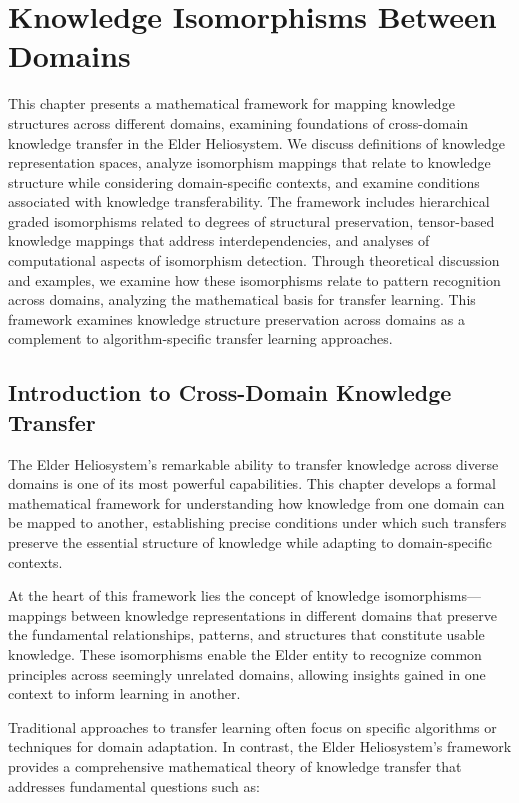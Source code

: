 \chapter{Knowledge Isomorphisms Between Domains}

\begin{chapterabstract}
This chapter presents a mathematical framework for mapping knowledge structures across different domains, examining foundations of cross-domain knowledge transfer in the Elder Heliosystem. We discuss definitions of knowledge representation spaces, analyze isomorphism mappings that relate to knowledge structure while considering domain-specific contexts, and examine conditions associated with knowledge transferability. The framework includes hierarchical graded isomorphisms related to degrees of structural preservation, tensor-based knowledge mappings that address interdependencies, and analyses of computational aspects of isomorphism detection. Through theoretical discussion and examples, we examine how these isomorphisms relate to pattern recognition across domains, analyzing the mathematical basis for transfer learning. This framework examines knowledge structure preservation across domains as a complement to algorithm-specific transfer learning approaches.
\end{chapterabstract}

\section{Introduction to Cross-Domain Knowledge Transfer}

The Elder Heliosystem's remarkable ability to transfer knowledge across diverse domains is one of its most powerful capabilities. This chapter develops a formal mathematical framework for understanding how knowledge from one domain can be mapped to another, establishing precise conditions under which such transfers preserve the essential structure of knowledge while adapting to domain-specific contexts.

At the heart of this framework lies the concept of knowledge isomorphisms—mappings between knowledge representations in different domains that preserve the fundamental relationships, patterns, and structures that constitute usable knowledge. These isomorphisms enable the Elder entity to recognize common principles across seemingly unrelated domains, allowing insights gained in one context to inform learning in another.

Traditional approaches to transfer learning often focus on specific algorithms or techniques for domain adaptation. In contrast, the Elder Heliosystem's framework provides a comprehensive mathematical theory of knowledge transfer that addresses fundamental questions such as:

